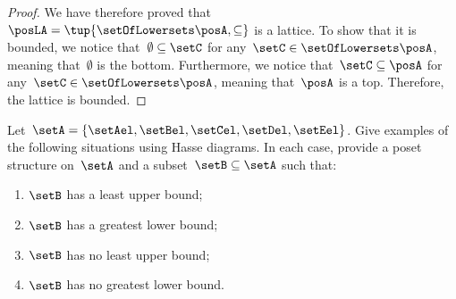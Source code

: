 \begin{proof}
	We have therefore proved that~$\posLA=\tup{\setOfLowersets \posA,\subseteq}$ is a lattice.
	To show that it is bounded, we notice that~$\emptyset \subseteq \setC$ for any~$\setC\in \setOfLowersets \posA$, meaning that~$\emptyset$ is the bottom.
	Furthermore, we notice that~$\setC\subseteq \posA$ for any~$\setC\in \setOfLowersets \posA$, meaning that~$\posA$ is a top.
	Therefore, the lattice is bounded.
\end{proof}

\vfill

\begin{gradedexercise}
	\label{ex:UpperLowerBounds}
	Let~$\setA = \{\setAel, \setBel, \setCel, \setDel, \setEel \}$.
	Give examples of the following situations using Hasse diagrams.
	In each case, provide a poset structure on~$\setA$ and a subset~$\setB \subseteq \setA$ such that:
	\begin{enumerate}
		\item $\setB$ has a least upper bound;
		\item $\setB$ has a greatest lower bound;
		\item $\setB$ has no least upper bound;
		\item $\setB$ has no greatest lower bound.
	\end{enumerate}
\end{gradedexercise}


